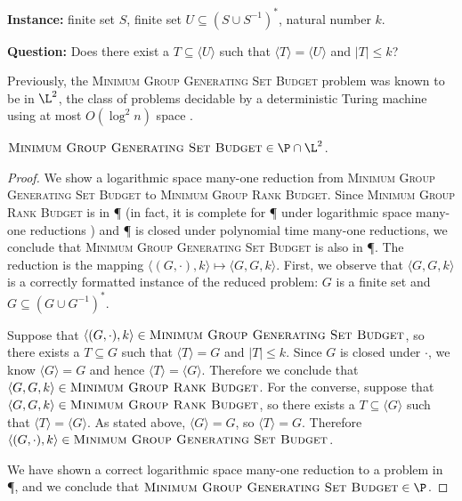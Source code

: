 \documentclass[]{article}
\newcommand{\gen}[1]{{\langle #1 \rangle}}
\begin{document}
\begin{definition}
  \mbox{}

  \textbf{Instance:} finite set $S$, finite set $U \subseteq (S \cup S^{-1})^*$, natural number $k$.

  \textbf{Question:} Does there exist a $T \subseteq \gen{U}$ such that $\gen{T} = \gen{U}$ and $|T| \leq k$?
\end{definition}

Previously, the \textsc{Minimum Group Generating Set Budget} problem was known to be in $\L^2$, the class of problems decidable by a deterministic Turing machine using at most $O(\log^2 n)$ space \cite{lsz77}.

\begin{theorem}
  $\textsc{Minimum Group Generating Set Budget} \in \P \cap \L^2$.
\end{theorem}
\begin{proof}
  We show a logarithmic space many-one reduction from \textsc{Minimum Group Generating Set Budget} to \textsc{Minimum Group Rank Budget}.
  Since \textsc{Minimum Group Rank Budget} is in \P{} (in fact, it is complete for \P{} under logarithmic space many-one reductions \cite{ghr95}) and \P{} is closed under polynomial time many-one reductions, we conclude that \textsc{Minimum Group Generating Set Budget} is also in \P.
  The reduction is the mapping $\langle (G, \cdot), k \rangle \mapsto \langle G, G, k \rangle$.
  First, we observe that $\langle G, G, k \rangle$ is a correctly formatted instance of the reduced problem: $G$ is a finite set and $G \subseteq (G \cup G^{-1})^*$.

  Suppose that $\langle (G, \cdot), k \rangle \in \textsc{Minimum Group Generating Set Budget}$, so there exists a $T \subseteq G$ such that $\gen{T} = G$ and $|T| \leq k$.
  Since $G$ is closed under $\cdot$, we know $\gen{G} = G$ and hence $\gen{T} = \gen{G}$.
  Therefore we conclude that $\langle G, G, k \rangle \in \textsc{Minimum Group Rank Budget}$.
  For the converse, suppose that $\langle G, G, k \rangle \in \textsc{Minimum Group Rank Budget}$, so there exists a $T \subseteq \gen{G}$ such that $\gen{T} = \gen{G}$.
  As stated above, $\gen{G} = G$, so $\gen{T} = G$.
  Therefore $\langle (G, \cdot), k \rangle \in \textsc{Minimum Group Generating Set Budget}$.

  We have shown a correct logarithmic space many-one reduction to a problem in \P, and we conclude that $\textsc{Minimum Group Generating Set Budget} \in \P$.
\end{proof}



\end{document}
